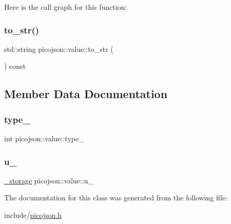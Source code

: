 Here is the call graph for this function\+:
\hypertarget{classpicojson_1_1value_a005099b2865752cf31b7ced33bd85f59}{}\label{classpicojson_1_1value_a005099b2865752cf31b7ced33bd85f59} 
\subsubsection{\texorpdfstring{to\+\_\+str()}{to\_str()}}
{\footnotesize\ttfamily std\+::string picojson\+::value\+::to\+\_\+str (\begin{DoxyParamCaption}{ }\end{DoxyParamCaption}) const\hspace{0.3cm}{\ttfamily [inline]}}



\subsection{Member Data Documentation}
\hypertarget{classpicojson_1_1value_af77ae4525a20f6fce6ea9ff1c4709312}{}\label{classpicojson_1_1value_af77ae4525a20f6fce6ea9ff1c4709312} 
\subsubsection{\texorpdfstring{type\+\_\+}{type\_}}
{\footnotesize\ttfamily int picojson\+::value\+::type\+\_\+\hspace{0.3cm}{\ttfamily [protected]}}

\hypertarget{classpicojson_1_1value_aa7948fe10fcbc19ab9c8dee5e5099f77}{}\label{classpicojson_1_1value_aa7948fe10fcbc19ab9c8dee5e5099f77} 
\subsubsection{\texorpdfstring{u\+\_\+}{u\_}}
{\footnotesize\ttfamily \hyperlink{unionpicojson_1_1value_1_1__storage}{\+\_\+storage} picojson\+::value\+::u\+\_\+\hspace{0.3cm}{\ttfamily [protected]}}



The documentation for this class was generated from the following file\+:\begin{DoxyCompactItemize}
\item 
include/\hyperlink{picojson_8h}{picojson.\+h}\end{DoxyCompactItemize}
